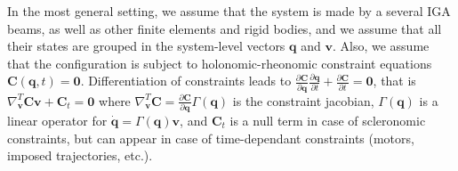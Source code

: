 \documentclass[review]{elsarticle}
\def\avect#1{{\boldsymbol{#1}}}
\begin{document}
In the most general setting, we assume that the system is made by a several IGA beams, as well as other finite elements and rigid bodies, and we assume that all their states are grouped in the system-level vectors  $\avect{q}$ and $\avect{v}$. Also, we assume that the configuration is subject to holonomic-rheonomic constraint equations $\avect{C}(\avect{q},t) = \avect{0}$. Differentiation of constraints leads to 
$\frac{\partial \avect{C}}{\partial \avect{q}} \frac{\partial \avect{q}}{\partial t} + \frac{\partial \avect{C}}{\partial t} = \avect{0}$, 
that is 
$\nabla_\avect{v}^T \avect{C} \avect{v} + \avect{C}_t = \avect{0}$
where
$\nabla_\avect{v}^T \avect{C} = \frac{\partial \avect{C}}{\partial \avect{q}} \Gamma(\avect{q})$ is the constraint jacobian, $\Gamma(\avect{q})$ is a linear operator for 
$\dot{\avect{q}} = \Gamma(\avect{q}) \avect{v}$, 
and $\avect{C}_t$ is a null term in case of scleronomic constraints, but can appear in case of time-dependant constraints (motors, imposed trajectories, etc.).
\end{document}
